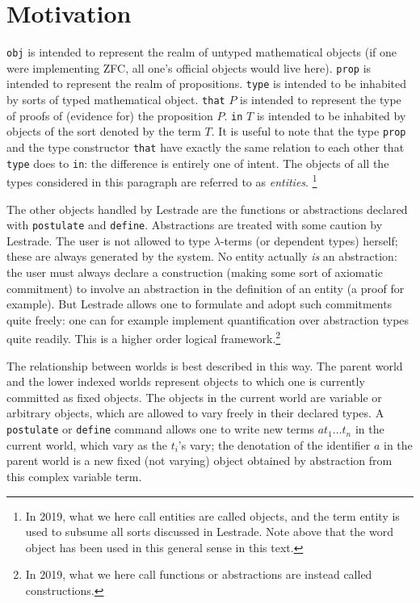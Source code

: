 \section{Motivation}

{\tt obj} is intended to represent the realm of untyped mathematical objects (if one were implementing ZFC, all one's official objects would live here).  {\tt prop} is intended to represent the realm of propositions.  {\tt type} is intended to be inhabited by sorts of typed mathematical object.  {\tt that} $P$ is intended to represent the type of proofs of (evidence for) the proposition $P$.   {\tt in} $T$ is intended to be inhabited by objects of the sort denoted by the term $T$.  It is useful to note that the type {\tt prop} and the type constructor {\tt that} have exactly the same relation to each other that {\tt type} does to {\tt in}:  the difference is entirely one of intent.  The objects of all the types considered in this paragraph are referred to as {\em entities}. \footnote{In 2019, what we here call entities are called objects, and the term entity is used to subsume all sorts discussed in Lestrade.  Note above that the word object has been used in this general sense in this text.}

The other objects handled by Lestrade are the functions or abstractions declared with {\tt postulate} and {\tt define}.   Abstractions are treated with some caution by Lestrade.  The user is not allowed to type $\lambda$-terms (or dependent types) herself; these are always generated by the system.   No entity actually {\em is\/} an abstraction:  the user must always
declare a construction (making some sort of axiomatic commitment) to involve an abstraction in the definition of an entity (a proof for example).   But Lestrade allows one to formulate and adopt such commitments quite freely:  one can for example implement quantification over abstraction types quite readily.   This is a higher order logical framework.\footnote{In 2019, what we here call functions or abstractions are instead called constructions.}

The relationship between worlds is best described in this way.   The parent world and the lower indexed worlds represent objects to which one is currently committed as fixed objects.  The objects in the current world are variable or arbitrary objects, which are allowed to vary freely in their declared types.   A {\tt postulate} or {\tt define} command allows one to write
new terms $at_1\ldots t_n$ in the current world, which vary as the $t_i$'s vary; the denotation of the identifier $a$ in the parent world is a new fixed (not varying) object obtained by abstraction from this complex variable term.


